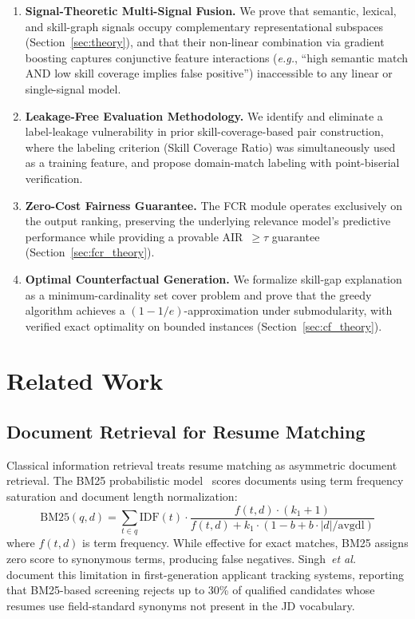 \documentclass[smallcondensed,numbers]{sn-jnl}
\begin{document}
\begin{enumerate}
    \item \textbf{Signal-Theoretic Multi-Signal Fusion.} We prove that semantic, lexical, and skill-graph signals occupy complementary representational subspaces (Section~\ref{sec:theory}), and that their non-linear combination via gradient boosting captures conjunctive feature interactions (\textit{e.g.}, ``high semantic match AND low skill coverage implies false positive'') inaccessible to any linear or single-signal model.

    \item \textbf{Leakage-Free Evaluation Methodology.} We identify and eliminate a label-leakage vulnerability in prior skill-coverage-based pair construction, where the labeling criterion (Skill Coverage Ratio) was simultaneously used as a training feature, and propose domain-match labeling with point-biserial verification.

    \item \textbf{Zero-Cost Fairness Guarantee.} The FCR module operates exclusively on the output ranking, preserving the underlying relevance model's predictive performance while providing a provable AIR~$\geq \tau$ guarantee (Section~\ref{sec:fcr_theory}).

    \item \textbf{Optimal Counterfactual Generation.} We formalize skill-gap explanation as a minimum-cardinality set cover problem and prove that the greedy algorithm achieves a $(1 - 1/e)$-approximation under submodularity, with verified exact optimality on bounded instances (Section~\ref{sec:cf_theory}).
\end{enumerate}

\section{Related Work}
\label{sec:related}

\subsection{Document Retrieval for Resume Matching}

Classical information retrieval treats resume matching as asymmetric document retrieval. The BM25 probabilistic model~\cite{robertson2009probabilistic} scores documents using term frequency saturation and document length normalization:
\begin{equation}
    \text{BM25}(q, d) = \sum_{t \in q} \text{IDF}(t) \cdot \frac{f(t,d) \cdot (k_1 + 1)}{f(t,d) + k_1 \cdot (1 - b + b \cdot |d|/\text{avgdl})}
\end{equation}
where $f(t,d)$ is term frequency. While effective for exact matches, BM25 assigns zero score to synonymous terms, producing false negatives. Singh~\textit{et al.}~\cite{singh2020automated} document this limitation in first-generation applicant tracking systems, reporting that BM25-based screening rejects up to 30\% of qualified candidates whose resumes use field-standard synonyms not present in the JD vocabulary.
\end{document}
